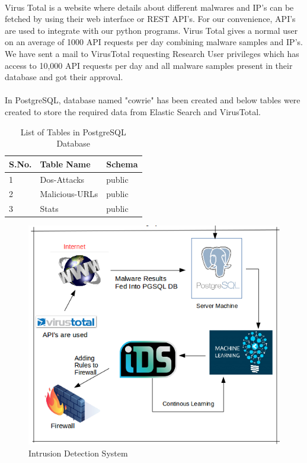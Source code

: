 \documentclass{article}
\begin{document}
\paragraph{}
Virus Total is a website where details about different malwares and IP's can be fetched by using their web interface or REST API's. For our convenience, API's are used to integrate with our python programs. Virus Total gives a normal user on an average of 1000 API requests per day combining malware samples and IP's. We have sent a mail to VirusTotal requesting Research User  privileges which has access to 10,000 API requests per day and all malware samples present in their database and got their approval.

\paragraph{}
In PostgreSQL, database named "cowrie" has been created and below tables were created to store the required data from Elastic Search and VirusTotal.

\begin{table}


\begin{tabular}{ |p{2cm}|p{5cm}|p{5cm}|  }
 \hline
 \textbf{S.No.} & \textbf{Table Name} & \textbf{Schema}\\
 \hline
 \hline
 1 & Dos-Attacks & public \\
 \hline
2 & Malicious-URLs & public \\
\hline
3 & Stats & public \\
\hline
\end{tabular}
 \caption{List of Tables in PostgreSQL Database}
\end{table}




\begin{figure}[H]
\centering
\caption{Intrusion Detection System}
\includegraphics[scale=0.7]{Intrusion_Detection_System}
\end{figure}
\end{document}
